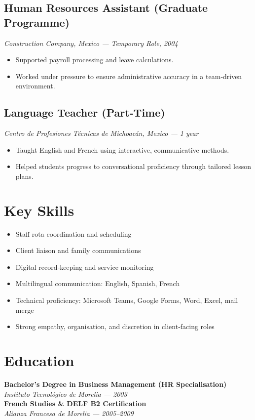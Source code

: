 \documentclass[11pt,a4paper]{article}
\begin{document}
	\subsection*{Human Resources Assistant (Graduate Programme)}
	\textit{Construction Company, Mexico --- Temporary Role, 2004}
	\begin{itemize}[leftmargin=*]
		\item Supported payroll processing and leave calculations.
		\item Worked under pressure to ensure administrative accuracy in a team‑driven environment.
	\end{itemize}
	
	\subsection*{Language Teacher (Part‑Time)}
	\textit{Centro de Profesiones T\'ecnicas de Michoac\'an, Mexico --- 1 year}
	\begin{itemize}[leftmargin=*]
		\item Taught English and French using interactive, communicative methods.
		\item Helped students progress to conversational proficiency through tailored lesson plans.
	\end{itemize}
	
	\section*{Key Skills}
	\begin{itemize}[leftmargin=*]
		\item Staff rota coordination and scheduling
		\item Client liaison and family communications
		\item Digital record‑keeping and service monitoring
		\item Multilingual communication: English, Spanish, French
		\item Technical proficiency: Microsoft Teams, Google Forms, Word, Excel, mail merge
		\item Strong empathy, organisation, and discretion in client‑facing roles
	\end{itemize}
	
	\section*{Education}
	\textbf{Bachelor's Degree in Business Management (HR Specialisation)}\\
	\textit{Instituto Tecnol\'ogico de Morelia --- 2003}\\[1mm]
	\textbf{French Studies \& DELF B2 Certification}\\
	\textit{Alianza Francesa de Morelia --- 2005--2009}
	
\end{document}
